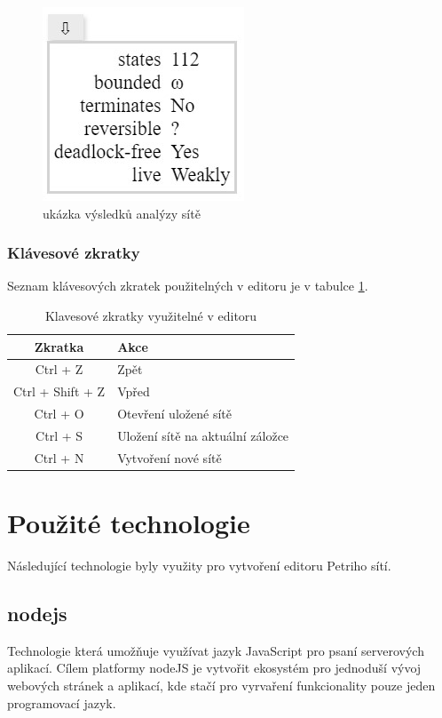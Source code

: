 \documentclass[
  biblatex,
  glossaries,
  index
]{kidiplom}
\begin{document}
\begin{figure}[h]
  \centering
  \includegraphics{analysis}
  \caption{ukázka výsledků analýzy sítě}\label{analýza obrázek}
\end{figure}


\subsubsection{Klávesové zkratky}\label{zkratky}

Seznam klávesových zkratek použitelných v editoru je v tabulce \ref{tabulka zkratky}.
\clearpage
\begin{table}[h!]
  \centering
  \begin{tabular}{| c | l |}
    \hline
    Zkratka & Akce \\
    \hline
    Ctrl + Z      & Zpět \\
    Ctrl + Shift + Z & Vpřed \\
    Ctrl + O & Otevření uložené sítě \\
    Ctrl + S & Uložení sítě na aktuální záložce\\
    Ctrl + N & Vytvoření nové sítě \\
    \hline
  \end{tabular}
  \caption{Klavesové zkratky využitelné v editoru}\label{tabulka zkratky}
\end{table}


\section{Použité technologie}

Následující technologie byly využity pro vytvoření editoru Petriho sítí.

\subsection{nodejs}
Technologie která umožňuje využívat jazyk JavaScript pro psaní 
serverových aplikací. Cílem platformy nodeJS je vytvořit
ekosystém pro jednoduší vývoj webových stránek a aplikací, 
kde stačí pro vyrvaření funkcionality pouze jeden programovací jazyk.
\end{document}
